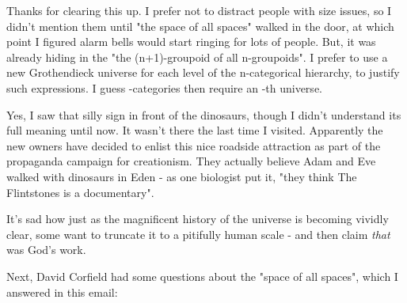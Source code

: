 Thanks for clearing this up.  I prefer not to distract people with
size issues, so I didn't mention them until "the space of all
spaces" walked in the door, at which point I figured alarm bells 
would start ringing for lots of people.  But, it was already hiding
in the "the (n+1)-groupoid of all n-groupoids".  I prefer to use a
new Grothendieck universe for each level of the n-categorical 
hierarchy, to justify such expressions.  I guess \omega -categories
then require an \omega -th universe. 

Yes, I saw that silly sign in front of the dinosaurs, though I didn't 
understand its full meaning until now.  It wasn't there the last time 
I visited.  Apparently the new owners have decided to enlist this nice 
roadside attraction as part of the propaganda campaign for creationism. 
They actually believe Adam and Eve walked with dinosaurs in Eden - as 
one biologist put it, "they think The Flintstones is a documentary".

It's sad how just as the magnificent history of the universe is becoming
vividly clear, some want to truncate it to a pitifully human scale - 
and then claim \emph{that} was God's work.

Next, David Corfield had some questions about the "space of all spaces",
which I answered in this email:

